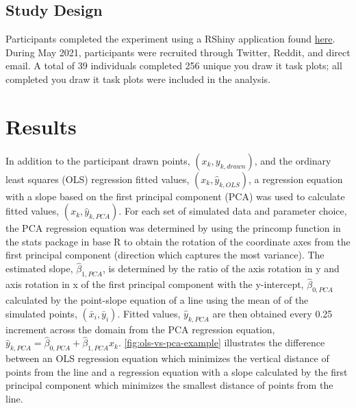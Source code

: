 \documentclass[12pt]{article}
\begin{document}
\hypertarget{study-design}{%
\subsection{Study Design}\label{study-design}}

Participants completed the experiment using a RShiny application found
\href{https://shiny.srvanderplas.com/you-draw-it/}{here}. During May
2021, participants were recruited through Twitter, Reddit, and direct
email. A total of 39 individuals completed 256 unique you draw it task
plots; all completed you draw it task plots were included in the
analysis.

\hypertarget{results}{%
\section{Results}\label{results}}

In addition to the participant drawn points, \((x_k, y_{k,drawn})\), and
the ordinary least squares (OLS) regression fitted values,
\((x_k, \hat y_{k,OLS})\), a regression equation with a slope based on
the first principal component (PCA) was used to calculate fitted values,
\((x_k, \hat y_{k,PCA})\). For each set of simulated data and parameter
choice, the PCA regression equation was determined by using the princomp
function in the stats package in base R to obtain the rotation of the
coordinate axes from the first principal component (direction which
captures the most variance). The estimated slope, \(\hat\beta_{1,PCA}\),
is determined by the ratio of the axis rotation in y and axis rotation
in x of the first principal component with the y-intercept,
\(\hat\beta_{0,PCA}\) calculated by the point-slope equation of a line
using the mean of of the simulated points, \((\bar x_i, \bar y_i)\).
Fitted values, \(\hat y_{k,PCA}\) are then obtained every 0.25 increment
across the domain from the PCA regression equation,
\(\hat y_{k,PCA} = \hat\beta_{0,PCA} + \hat\beta_{1,PCA} x_k\).
\cref{fig:ols-vs-pca-example} illustrates the difference between an OLS
regression equation which minimizes the vertical distance of points from
the line and a regression equation with a slope calculated by the first
principal component which minimizes the smallest distance of points from
the line.
\end{document}
